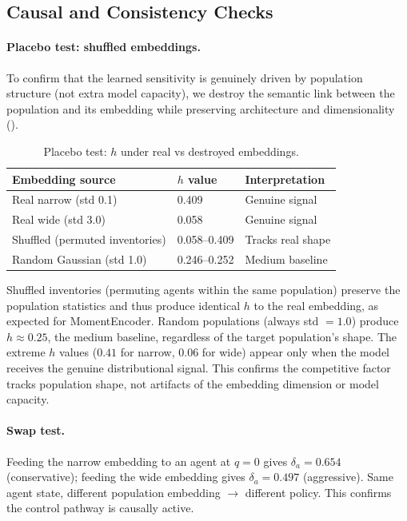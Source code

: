 \documentclass[11pt,a4paper]{article}
\begin{document}
\subsection{Causal and Consistency Checks}

\paragraph{Placebo test: shuffled embeddings.}
To confirm that the learned sensitivity is genuinely driven by population structure (not extra model capacity), we destroy the semantic link between the population and its embedding while preserving architecture and dimensionality ().

\begin{table}[!htb]
\centering
\caption{Placebo test: $h$ under real vs destroyed embeddings.}
\label{tab:placebo}
\begin{tabular}{@{}lll@{}}
\toprule
Embedding source & $h$ value & Interpretation \\
\midrule
Real narrow (std 0.1) & 0.409 & Genuine signal \\
Real wide (std 3.0) & 0.058 & Genuine signal \\
\midrule
Shuffled (permuted inventories) & 0.058--0.409 & Tracks real shape \\
Random Gaussian (std 1.0) & 0.246--0.252 & Medium baseline \\
\bottomrule
\end{tabular}
\end{table}

Shuffled inventories (permuting agents within the same population) preserve the population statistics and thus produce identical $h$ to the real embedding, as expected for MomentEncoder. Random populations (always std $= 1.0$) produce $h \approx 0.25$, the medium baseline, regardless of the target population's shape. The extreme $h$ values ($0.41$ for narrow, $0.06$ for wide) appear only when the model receives the genuine distributional signal. This confirms the competitive factor tracks population shape, not artifacts of the embedding dimension or model capacity.

\paragraph{Swap test.}
Feeding the narrow embedding to an agent at $q = 0$ gives $\delta_a = 0.654$ (conservative); feeding the wide embedding gives $\delta_a = 0.497$ (aggressive). Same agent state, different population embedding $\to$ different policy. This confirms the control pathway is causally active.
\end{document}
